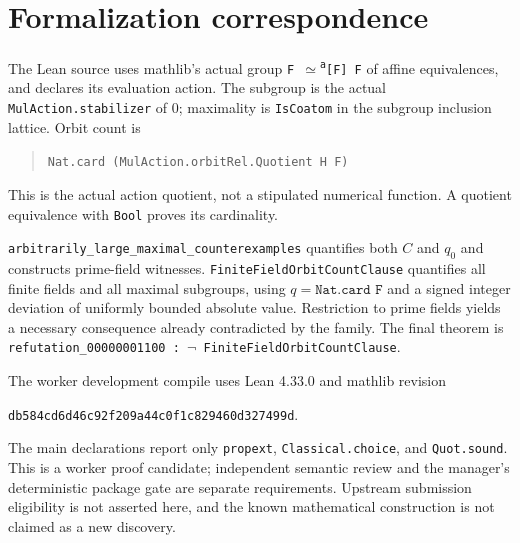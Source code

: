 \documentclass[11pt]{article}
\begin{document}
\section{Formalization correspondence}
The Lean source uses mathlib's actual group \texttt{F $\simeq$\textsuperscript{a}[F] F}
of affine equivalences, and declares its evaluation action. The subgroup is the
actual \texttt{MulAction.stabilizer} of $0$; maximality is \texttt{IsCoatom} in
the subgroup inclusion lattice. Orbit count is
\begin{quote}\texttt{Nat.card (MulAction.orbitRel.Quotient H F)}\end{quote}
This is the actual action quotient, not a stipulated numerical function. A quotient equivalence with \texttt{Bool} proves its cardinality.

\texttt{arbitrarily\_large\_maximal\_counterexamples} quantifies both $C$ and
$q_0$ and constructs prime-field witnesses. \texttt{FiniteFieldOrbitCountClause}
quantifies all finite fields and all maximal subgroups, using
$q=\texttt{Nat.card F}$ and a signed integer deviation of uniformly bounded
absolute value. Restriction to prime fields yields a necessary consequence
already contradicted by the family. The final theorem is
\texttt{refutation\_00000001100 : $\neg$ FiniteFieldOrbitCountClause}.

The worker development compile uses Lean 4.33.0 and mathlib revision
\par\noindent\texttt{db584cd6d46c92f209a44c0f1c829460d327499d}.\par
The main declarations report
only \texttt{propext}, \texttt{Classical.choice}, and \texttt{Quot.sound}.
This is a worker proof candidate; independent semantic review and the manager's
deterministic package gate are separate requirements. Upstream submission
eligibility is not asserted here, and the known mathematical construction is
not claimed as a new discovery.
\end{document}

